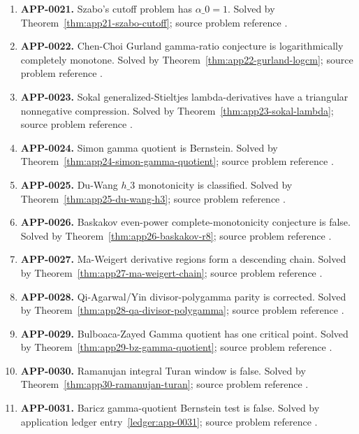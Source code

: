 \documentclass[11pt]{article}
\numberwithin{equation}{section}
\theoremstyle{definition}
\theoremstyle{remark}
\newcommand{\1}{\mathbf 1}
\begin{document}
\begin{enumerate}
\item \label{ledger:app-0021}\textbf{APP-0021.} Szabo's cutoff problem has \(\alpha\_0=1\). Solved by Theorem~\ref{thm:app21-szabo-cutoff}; source problem reference \cite{szabo-cm}.
\item \label{ledger:app-0022}\textbf{APP-0022.} Chen-Choi Gurland gamma-ratio conjecture is logarithmically completely monotone. Solved by Theorem~\ref{thm:app22-gurland-logcm}; source problem reference \cite{chen-choi-gurland}.
\item \label{ledger:app-0023}\textbf{APP-0023.} Sokal generalized-Stieltjes lambda-derivatives have a triangular nonnegative compression. Solved by Theorem~\ref{thm:app23-sokal-lambda}; source problem reference \cite{sokal-gs}.
\item \label{ledger:app-0024}\textbf{APP-0024.} Simon gamma quotient is Bernstein. Solved by Theorem~\ref{thm:app24-simon-gamma-quotient}; source problem reference \cite{simon-moment}.
\item \label{ledger:app-0025}\textbf{APP-0025.} Du-Wang \(h\_3\) monotonicity is classified. Solved by Theorem~\ref{thm:app25-du-wang-h3}; source problem reference \cite{du-wang-h3}.
\item \label{ledger:app-0026}\textbf{APP-0026.} Baskakov even-power complete-monotonicity conjecture is false. Solved by Theorem~\ref{thm:app26-baskakov-r8}; source problem reference \cite{abel-gawronski-neuschel}.
\item \label{ledger:app-0027}\textbf{APP-0027.} Ma-Weigert derivative regions form a descending chain. Solved by Theorem~\ref{thm:app27-ma-weigert-chain}; source problem reference \cite{ma-weigert-log-functions}.
\item \label{ledger:app-0028}\textbf{APP-0028.} Qi-Agarwal/Yin divisor-polygamma parity is corrected. Solved by Theorem~\ref{thm:app28-qa-divisor-polygamma}; source problem reference \cite{qi-agarwal-gamma-ratios}.
\item \label{ledger:app-0029}\textbf{APP-0029.} Bulboaca-Zayed Gamma quotient has one critical point. Solved by Theorem~\ref{thm:app29-bz-gamma-quotient}; source problem reference \cite{bulboaca-zayed-gamma}.
\item \label{ledger:app-0030}\textbf{APP-0030.} Ramanujan integral Turan window is false. Solved by Theorem~\ref{thm:app30-ramanujan-turan}; source problem reference \cite{mishra-swaminathan-ramanujan}.
\item \label{ledger:app-0031}\textbf{APP-0031.} Baricz gamma-quotient Bernstein test is false. Solved by application ledger entry~\ref{ledger:app-0031}; source problem reference \cite{baricz-turan}.

\end{enumerate}
\end{document}
